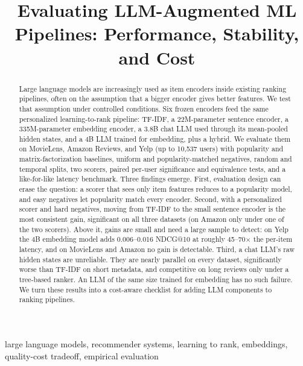\documentclass[conference]{IEEEtran}
\newif\ifanon
\begin{document}
\title{Evaluating LLM-Augmented ML Pipelines: Performance, Stability, and Cost}

\ifanon
\author{\IEEEauthorblockN{Anonymous Author(s)}}
\else
\author{
}
\fi

\maketitle

\begin{abstract}
Large language models are increasingly used as item encoders inside
existing ranking pipelines, often on the assumption that a bigger
encoder gives better features. We test that assumption under controlled
conditions. Six frozen encoders feed the same personalized
learning-to-rank pipeline: TF-IDF, a 22M-parameter sentence encoder, a
335M-parameter embedding encoder, a 3.8B chat LLM used through its
mean-pooled hidden states, and a 4B LLM trained for embedding, plus a
hybrid. We evaluate them on MovieLens, Amazon Reviews, and Yelp (up to
10{,}537 users) with popularity and matrix-factorization baselines,
uniform and popularity-matched negatives, random and temporal splits,
two scorers, paired per-user significance and equivalence tests, and a
like-for-like latency benchmark. Three findings emerge. First,
evaluation design can erase the question: a scorer that sees only item
features reduces to a popularity model, and easy negatives let
popularity match every encoder. Second, with a personalized scorer and
hard negatives, moving from TF-IDF to the small sentence encoder is the
most consistent gain, significant on all three datasets (on Amazon only
under one of the two scorers).
Above it, gains are small and need a large sample to detect: on Yelp
the 4B embedding model adds 0.006--0.016 NDCG@10 at roughly
45--70$\times$ the per-item latency, and on MovieLens and Amazon no gain
is detectable. Third, a chat LLM's raw hidden states are unreliable.
They are nearly parallel on every dataset, significantly worse than
TF-IDF on short metadata, and competitive on long reviews only under a
tree-based ranker. An LLM of the same size trained for embedding has no
such failure. We turn these results into a cost-aware checklist for
adding LLM components to ranking pipelines.
\end{abstract}

\begin{IEEEkeywords}
large language models, recommender systems, learning to rank, embeddings, quality-cost tradeoff, empirical evaluation
\end{IEEEkeywords}















\end{document}

